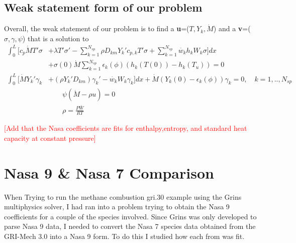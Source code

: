 \documentclass{article}
\newcommand\tab[1][1cm]{\hspace*{#1}}
\newcommand{\red}[1]{\textcolor{red}{[#1]}} %
\begin{document}
\subsection{Weak statement form of our problem}
  Overall, the weak statement of our problem is to find a \textbf{u}=($T,Y_{k},\dot{M}$) and a \textbf{v}=($\sigma,\gamma,\psi$) that is a solution to
  \begin{align*}
    \int_{0}^{L}[c_{p}\dot{M}T'\sigma&+\lambda T'\sigma '-\sum_{k=1}^{N_{sp}}\rho D_{km}Y_{k}'c_{p,k}T'\sigma+\sum_{k=1}^{N_{sp}}\dot{w_{k}}h_{k}W_{k}\sigma ]dx  \\
    &+ \sigma(0)\dot{M}\sum_{k=1}^{N_{sp}}\epsilon _{k}(\phi)(h_{k}(T(0))-h_{k}(T_{u})) = 0 \\
    \int_{0}^{L}[\dot{M}Y_{k}'\gamma_{k}&+(\rho Y_{k}'D_{km})\gamma_{k}'-\dot{w_{k}}W_{k}\gamma_{k}]dx + \dot{M}(Y_{k}(0)-\epsilon_{k}(\phi))\gamma_{k} = 0,\quad k=1,..,N_{sp} \\
   &\qquad \psi(\dot{M}-\rho u) = 0 \\
    &\qquad\rho = \frac{P\bar{W}}{RT} 
    \end{align*}


\red{Add that the Nasa coefficients are fits for enthalpy,entropy, and standard heat capacity at constant pressure}
\section{Nasa 9 \& Nasa 7 Comparison}
\tab When Trying to run the methane combustion gri.30 example using the Grins multiphysics solver, I had ran into a problem trying to obtain the Nasa 9 coefficients for a couple of the species involved. Since Grins was only developed to parse Nasa 9 data, I needed to convert the Nasa 7 species data obtained from the GRI-Mech 3.0 into a Nasa 9 form. To do this I studied how each from was fit.
\end{document}
